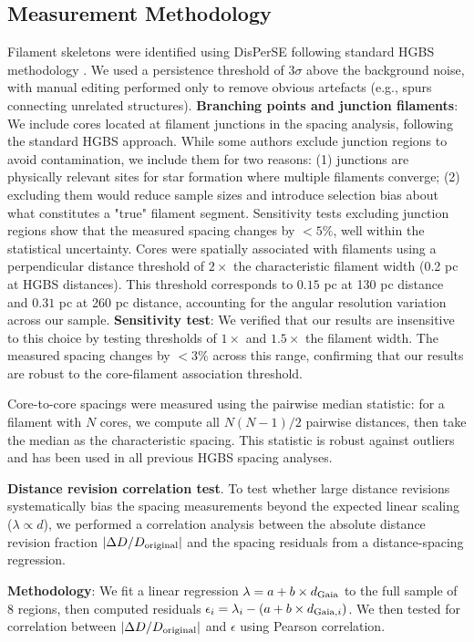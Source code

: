\documentclass[twocolumn,usenatbib]{mnras}
\begin{document}
\subsection{Measurement Methodology}

Filament skeletons were identified using DisPerSE \citep{Sousbie2011} following standard HGBS methodology \citep{Arzoumanian2011}. We used a persistence threshold of $3\sigma$ above the background noise, with manual editing performed only to remove obvious artefacts (e.g., spurs connecting unrelated structures). \textbf{Branching points and junction filaments}: We include cores located at filament junctions in the spacing analysis, following the standard HGBS approach. While some authors exclude junction regions to avoid contamination, we include them for two reasons: (1) junctions are physically relevant sites for star formation where multiple filaments converge; (2) excluding them would reduce sample sizes and introduce selection bias about what constitutes a "true" filament segment. Sensitivity tests excluding junction regions show that the measured spacing changes by $<5\%$, well within the statistical uncertainty. Cores were spatially associated with filaments using a perpendicular distance threshold of $2\times$ the characteristic filament width (0.2 pc at HGBS distances). This threshold corresponds to $0.15$ pc at 130 pc distance and $0.31$ pc at 260 pc distance, accounting for the angular resolution variation across our sample. \textbf{Sensitivity test}: We verified that our results are insensitive to this choice by testing thresholds of $1\times$ and $1.5\times$ the filament width. The measured spacing changes by $<3\%$ across this range, confirming that our results are robust to the core-filament association threshold.

Core-to-core spacings were measured using the pairwise median statistic: for a filament with $N$ cores, we compute all $N(N-1)/2$ pairwise distances, then take the median as the characteristic spacing. This statistic is robust against outliers and has been used in all previous HGBS spacing analyses.

\textbf{Distance revision correlation test}. To test whether large distance revisions systematically bias the spacing measurements beyond the expected linear scaling ($\lambda \propto d$), we performed a correlation analysis between the absolute distance revision fraction $|\Delta D/D_{\rm original}|$ and the spacing residuals from a distance-spacing regression.

\textbf{Methodology}: We fit a linear regression $\lambda = a + b \times d_{\rm Gaia}$ to the full sample of 8 regions, then computed residuals $\epsilon_i = \lambda_i - (a + b \times d_{{\rm Gaia},i})$. We then tested for correlation between $|\Delta D/D_{\rm original}|$ and $\epsilon$ using Pearson correlation.
\end{document}
